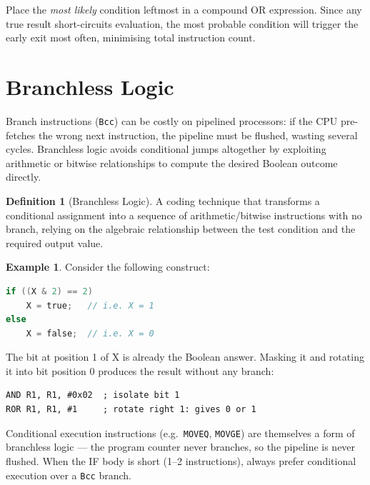 \documentclass[11pt, a4paper, notitlepage]{report}
\theoremstyle{definition}
\newtheorem{definition}[theorem]{Definition}
\theoremstyle{remark}
\theoremstyle{definition}
\newtheorem{example}[theorem]{Example}
\begin{document}
\begin{keyresult}[title={Optimising Compound OR}]
Place the \emph{most likely} condition leftmost in a compound OR expression. Since any true result short-circuits evaluation, the most probable condition will trigger the early exit most often, minimising total instruction count.
\end{keyresult}

\section{Branchless Logic}

Branch instructions (\texttt{Bcc}) can be costly on pipelined processors: if the CPU pre-fetches the wrong next instruction, the pipeline must be flushed, wasting several cycles. Branchless logic avoids conditional jumps altogether by exploiting arithmetic or bitwise relationships to compute the desired Boolean outcome directly.

\begin{definition}[Branchless Logic]
\label{def:branchless}
A coding technique that transforms a conditional assignment into a sequence of arithmetic/bitwise instructions with no branch, relying on the algebraic relationship between the test condition and the required output value.
\end{definition}

\begin{example}
Consider the following construct:
\begin{lstlisting}[language=C]
if ((X & 2) == 2)
    X = true;   // i.e. X = 1
else
    X = false;  // i.e. X = 0
\end{lstlisting}
The bit at position 1 of X is already the Boolean answer. Masking it and rotating it into bit position 0 produces the result without any branch:
\begin{lstlisting}
AND R1, R1, #0x02  ; isolate bit 1
ROR R1, R1, #1     ; rotate right 1: gives 0 or 1
\end{lstlisting}
\end{example}

\begin{examtip}[title={Conditional Execution as Branchless Code}]
Conditional execution instructions (e.g.\ \texttt{MOVEQ}, \texttt{MOVGE}) are themselves a form of branchless logic --- the program counter never branches, so the pipeline is never flushed. When the IF body is short (1--2 instructions), always prefer conditional execution over a \texttt{Bcc} branch.
\end{examtip}
\end{document}
